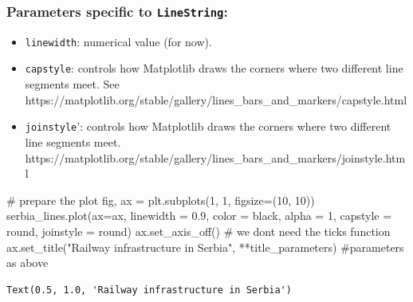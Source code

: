 \documentclass[
  letterpaper,
  DIV=11,
  numbers=noendperiod]{scrreprt}
\newenvironment{Shaded}{\begin{snugshade}}{\end{snugshade}}
\newcommand{\CommentTok}[1]{\textcolor[rgb]{0.37,0.37,0.37}{#1}}
\newcommand{\DecValTok}[1]{\textcolor[rgb]{0.68,0.00,0.00}{#1}}
\newcommand{\FloatTok}[1]{\textcolor[rgb]{0.68,0.00,0.00}{#1}}
\newcommand{\NormalTok}[1]{\textcolor[rgb]{0.00,0.23,0.31}{#1}}
\newcommand{\OperatorTok}[1]{\textcolor[rgb]{0.37,0.37,0.37}{#1}}
\newcommand{\StringTok}[1]{\textcolor[rgb]{0.13,0.47,0.30}{#1}}
\providecommand{\tightlist}{%
  \setlength{\itemsep}{0pt}\setlength{\parskip}{0pt}}\usepackage{longtable,booktabs,array}
\begin{document}
\subsubsection{\texorpdfstring{Parameters specific to
\texttt{LineString}:}{Parameters specific to LineString:}}\label{parameters-specific-to-linestring}

\begin{itemize}
\tightlist
\item
  \texttt{linewidth}: numerical value (for now).
\item
  \texttt{capstyle}: controls how Matplotlib draws the corners where two
  different line segments meet. See
  https://matplotlib.org/stable/gallery/lines\_bars\_and\_markers/capstyle.html
\item
  \texttt{joinstyle}': controls how Matplotlib draws the corners where
  two different line segments meet.
  https://matplotlib.org/stable/gallery/lines\_bars\_and\_markers/joinstyle.html
\end{itemize}

\begin{Shaded}
\begin{Highlighting}[]
\CommentTok{\# prepare the plot}
\NormalTok{fig, ax }\OperatorTok{=}\NormalTok{ plt.subplots(}\DecValTok{1}\NormalTok{, }\DecValTok{1}\NormalTok{, figsize}\OperatorTok{=}\NormalTok{(}\DecValTok{10}\NormalTok{, }\DecValTok{10}\NormalTok{))}
\NormalTok{serbia\_lines.plot(ax}\OperatorTok{=}\NormalTok{ax, linewidth }\OperatorTok{=} \FloatTok{0.9}\NormalTok{, color }\OperatorTok{=} \StringTok{\textquotesingle{}black\textquotesingle{}}\NormalTok{, alpha }\OperatorTok{=} \DecValTok{1}\NormalTok{, capstyle }\OperatorTok{=} \StringTok{\textquotesingle{}round\textquotesingle{}}\NormalTok{, joinstyle }\OperatorTok{=} \StringTok{\textquotesingle{}round\textquotesingle{}}\NormalTok{)}
\NormalTok{ax.set\_axis\_off() }\CommentTok{\# we don\textquotesingle{}t need the ticks function}
\NormalTok{ax.set\_title(}\StringTok{"Railway infrastructure in Serbia"}\NormalTok{, }\OperatorTok{**}\NormalTok{title\_parameters) }\CommentTok{\#parameters as above}
\end{Highlighting}
\end{Shaded}

\begin{verbatim}
Text(0.5, 1.0, 'Railway infrastructure in Serbia')
\end{verbatim}
\end{document}
